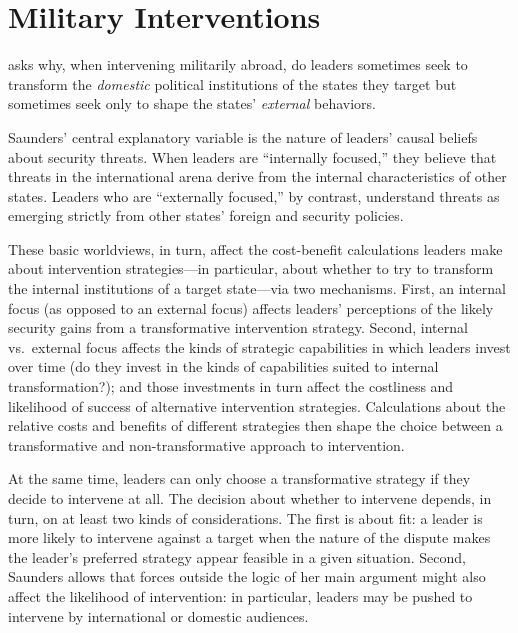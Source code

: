 \documentclass[
  12pt,
]{book}
\begin{document}
\hypertarget{military-interventions}{%
\section{Military Interventions}\label{military-interventions}}

\citet{saunders2011leaders} asks why, when intervening militarily abroad, do leaders sometimes seek to transform the \emph{domestic} political institutions of the states they target but sometimes seek only to shape the states' \emph{external} behaviors.

Saunders' central explanatory variable is the nature of leaders' causal beliefs about security threats. When leaders are ``internally focused,'' they believe that threats in the international arena derive from the internal characteristics of other states. Leaders who are ``externally focused,'' by contrast, understand threats as emerging strictly from other states' foreign and security policies.

These basic worldviews, in turn, affect the cost-benefit calculations leaders make about intervention strategies---in particular, about whether to try to transform the internal institutions of a target state---via two mechanisms. First, an internal focus (as opposed to an external focus) affects leaders' perceptions of the likely security gains from a transformative intervention strategy. Second, internal vs.~external focus affects the kinds of strategic capabilities in which leaders invest over time (do they invest in the kinds of capabilities suited to internal transformation?); and those investments in turn affect the costliness and likelihood of success of alternative intervention strategies. Calculations about the relative costs and benefits of different strategies then shape the choice between a transformative and non-transformative approach to intervention.

At the same time, leaders can only choose a transformative strategy if they decide to intervene at all. The decision about whether to intervene depends, in turn, on at least two kinds of considerations. The first is about fit: a leader is more likely to intervene against a target when the nature of the dispute makes the leader's preferred strategy appear feasible in a given situation. Second, Saunders allows that forces outside the logic of her main argument might also affect the likelihood of intervention: in particular, leaders may be pushed to intervene by international or domestic audiences.
\end{document}
